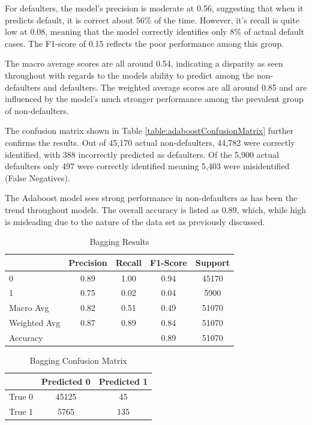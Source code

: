 \documentclass[12pt]{article}
\begin{document}
For defaulters, the model's precision is moderate at 0.56, suggesting that when it predicts default, it is correct about 56\% of the time. However, it's recall is quite low at 0.08, meaning that the model correctly identifies only 8\% of actual default cases. The F1-score of 0.15 reflects the poor performance among this group.

The macro average scores are all around 0.54, indicating a disparity as seen throughout with regards to the models ability to predict among the non-defaulters and defaulters. The weighted average scores are all around 0.85 and are influenced by the model's much stronger performance among the prevalent group of non-defaulters.

The confusion matrix shown in Table \ref{table:adaboostConfusionMatrix} further confirms the results. Out of 45,170 actual non-defaulters, 44,782 were correctly identified, with 388 incorrectly predicted as defaulters. Of the 5,900 actual defaulters only 497 were correctly identified meaning 5,403 were misidentified (False Negatives).

The Adaboost model sees strong performance in non-defaulters as has been the trend throughout models. The overall accuracy is listed as 0.89, which, while high is misleading due to the nature of the data set as previously discussed.

\begin{table}[htbp]
    \centering
    \caption{Bagging Results}
    \begin{tabular}{lcccc}
        \toprule
        & Precision & Recall & F1-Score & Support \\
        \midrule
        0 & 0.89 & 1.00 & 0.94 & 45170 \\
        1 & 0.75 & 0.02 & 0.04 & 5900 \\
        Macro Avg & 0.82 & 0.51 & 0.49 & 51070 \\
        Weighted Avg & 0.87 & 0.89 & 0.84 & 51070 \\
        \midrule
        Accuracy & & & 0.89 & 51070 \\
        \bottomrule
    \end{tabular}
    \label{table:boostingResults}
\end{table}

\begin{table}[htbp]
    \centering
    \caption{Bagging Confusion Matrix}
    \begin{tabular}{lcc}
        \toprule
        & Predicted 0 & Predicted 1 \\
        \midrule
        True 0 & 45125 & 45 \\
        True 1 & 5765 & 135 \\
        \bottomrule
    \end{tabular}
    \label{table:boostingConfusionMatrix}
\end{table}
\end{document}
